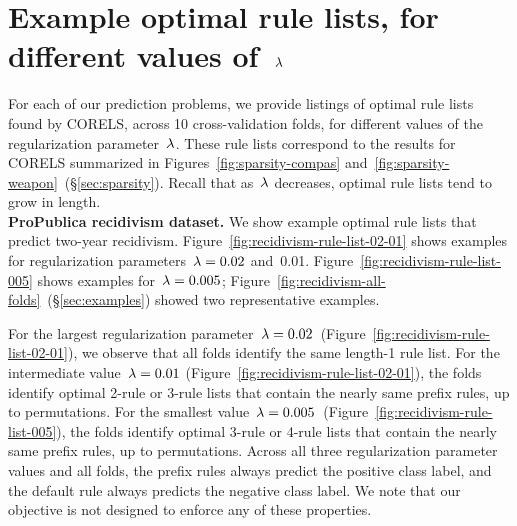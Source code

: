 \section{Example optimal rule lists, for different values of~${\lambda}$}
\label{appendix:examples}

For each of our prediction problems, we provide listings of
optimal rule lists found by CORELS, across 10 cross-validation folds,
for different values of the regularization parameter~${\lambda}$.
%
These rule lists correspond to the results for CORELS summarized
in Figures~\ref{fig:sparsity-compas} and~\ref{fig:sparsity-weapon}~(\S\ref{sec:sparsity}).
%
Recall that as~${\lambda}$ decreases, optimal rule lists tend to grow in length. \\

\textbf{ProPublica recidivism dataset.}
We show example optimal rule lists that predict two-year recidivism.
%
Figure~\ref{fig:recidivism-rule-list-02-01} shows examples for
regularization parameters~${{\lambda} = 0.02}$ and~0.01.
%
Figure~\ref{fig:recidivism-rule-list-005} shows examples for~${{\lambda} = 0.005}$;
Figure~\ref{fig:recidivism-all-folds}~(\S\ref{sec:examples}) showed two representative examples.

For the largest regularization parameter~${{\lambda} = 0.02}$~(Figure~\ref{fig:recidivism-rule-list-02-01}),
we observe that all folds identify the same length-1 rule list.
%
For the intermediate value~${{\lambda} = 0.01}$ (Figure~\ref{fig:recidivism-rule-list-02-01}),
the folds identify optimal 2-rule or 3-rule lists that contain the nearly same prefix rules,
up to permutations.
%
For the smallest value~${{\lambda} = 0.005}$~(Figure~\ref{fig:recidivism-rule-list-005}),
the folds identify optimal 3-rule or 4-rule lists that contain the nearly same prefix rules,
up to permutations.
%
Across all three regularization parameter values and all folds,
the prefix rules always predict the positive class label,
and the default rule always predicts the negative class label.
%
We note that our objective is not designed to enforce any of these properties.

